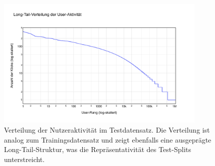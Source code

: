 
\begin{figure}[H]
    \centering
    \includegraphics[width=0.9\textwidth]{content/figures/svg/nutzer_verteilung_test.pdf}
    \caption{Verteilung der Nutzeraktivität im Testdatensatz. Die Verteilung ist analog zum Trainingsdatensatz und zeigt ebenfalls eine ausgeprägte Long-Tail-Struktur, was die Repräsentativität des Test-Splits unterstreicht.}
    \label{fig:nutzerverteilung_test}
\end{figure}